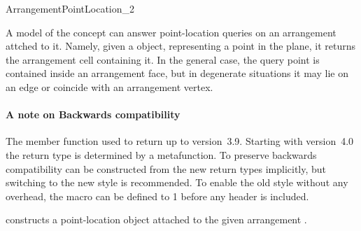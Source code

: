 
\ccRefPageBegin

\begin{ccRefConcept}{ArrangementPointLocation_2}

\ccDefinition

A model of the \ccRefName{} concept can answer point-location queries on
an arrangement attched to it. Namely, given a 
object, representing a point in the plane, it returns the arrangement cell
containing it. In the general case, the query point is contained inside an
arrangement face, but in degenerate situations it may lie on an edge or
coincide with an arrangement vertex.

\paragraph{A note on Backwards compatibility}
The  member function used to return  up to
\cgal{} version~3.9. Starting with \cal{} version~4.0 the return type
is determined by a metafunction. To preserve backwards compatibility
 can be constructed from the new return types
implicitly, but switching to the new style is recommended. To enable
the old style without any overhead, the macro
 can be defined to 1 before any
\cgal{} header is included.

\ccTypes



\ccCreation
{}


  {constructs a point-location object \ccVar{} attached to the given
   arrangement .}


\end{ccRefConcept}
